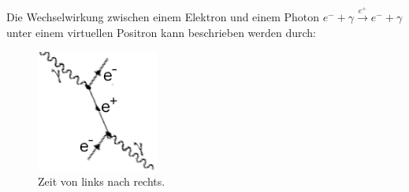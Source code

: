 \documentclass{subfiles}
\begin{document}
    \subaufgabe{}
        Die Wechselwirkung zwischen einem Elektron und einem Photon $e^{-}+\gamma\stackrel{e^+}{\longrightarrow}e^-+\gamma$ unter einem virtuellen Positron kann beschrieben werden durch:
        \begin{figure}[H]
            \centering
            \includegraphics[height=4cm]{../Bilddateien/Unknown.png}
            \caption{Zeit von links nach rechts.}
        \end{figure}
\end{document}
